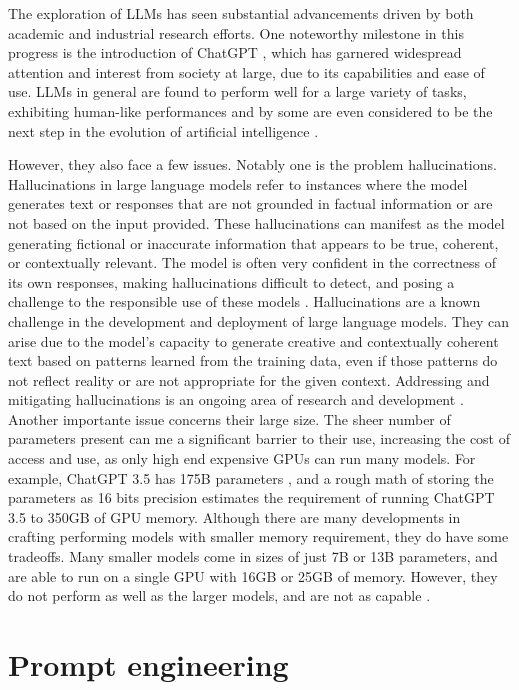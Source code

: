 The exploration of LLMs has seen substantial advancements driven by both academic and industrial research efforts. One noteworthy milestone in this progress is the introduction of ChatGPT \cite{chatgpt}, which has garnered widespread attention and interest from society at large, due to its capabilities and ease of use. LLMs in general are found to perform well for a large variety of tasks, exhibiting human-like performances and by some are even considered to be the next step in the evolution of artificial intelligence \cite{bubeck2023sparks}.  

However, they also face a few issues. Notably one is the problem hallucinations. Hallucinations in large language models refer to instances where the model generates text or responses that are not grounded in factual information or are not based on the input provided. These hallucinations can manifest as the model generating fictional or inaccurate information that appears to be true, coherent, or contextually relevant. The model is often very confident in the correctness of its own responses, making hallucinations difficult to detect, and posing a challenge to the responsible use of these models \cite{alkaissi2023artificial,azamfirei2023large}. Hallucinations are a known challenge in the development and deployment of large language models. They can arise due to the model's capacity to generate creative and contextually coherent text based on patterns learned from the training data, even if those patterns do not reflect reality or are not appropriate for the given context. Addressing and mitigating hallucinations is an ongoing area of research and development \cite{gunjal2023detecting,mundler2023self,peng2023check}. Another importante issue concerns their large size. The sheer number of parameters present can me a significant barrier to their use, increasing the cost of access and use, as only high end expensive GPUs can run many models. For example, ChatGPT 3.5 has 175B parameters \cite{chatgpt-parameters}, and a rough math of storing the parameters as 16 bits precision estimates the requirement of running ChatGPT 3.5 to 350GB of GPU memory. Although there are many developments in crafting performing models with smaller memory requirement, they do have some tradeoffs. Many smaller models come in sizes of just 7B or 13B parameters, and are able to run on a single GPU with 16GB or 25GB of memory. However, they do not perform as well as the larger models, and are not as capable \cite{touvronllama,falcon40b,mpt7b,wizard-vicuna}. 

\section{Prompt engineering}

